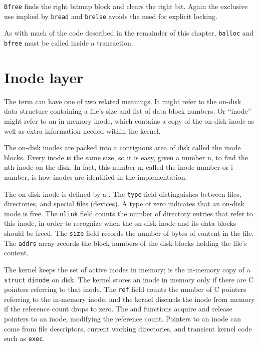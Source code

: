 \lstinline{Bfree}
finds the right bitmap block and clears the right bit.
Again the exclusive use implied by
\lstinline{bread}
and
\lstinline{brelse}
avoids the need for explicit locking.

As with much of the code described in the remainder of this chapter, 
\lstinline{balloc}
and
\lstinline{bfree}
must be called inside a transaction.
\section{Inode layer}

The term 
can have one of two related meanings.
It might refer to the on-disk data structure containing
a file's size and list of data block numbers.
Or ``inode'' might refer to an in-memory inode, which contains
a copy of the on-disk inode as well as extra information needed
within the kernel.

The on-disk inodes
are packed into a contiguous area
of disk called the inode blocks.
Every inode is the same size, so it is easy, given a
number n, to find the nth inode on the disk.
In fact, this number n, called the inode number or i-number,
is how inodes are identified in the implementation.

The on-disk inode is defined by a
.
The 
\lstinline{type}
field distinguishes between files, directories, and special
files (devices).
A type of zero indicates that an on-disk inode is free.
The
\lstinline{nlink}
field counts the number of directory entries that
refer to this inode, in order to recognize when the
on-disk inode and its data blocks should be freed.
The
\lstinline{size}
field records the number of bytes of content in the file.
The
\lstinline{addrs}
array records the block numbers of the disk blocks holding
the file's content.

The kernel keeps the set of active inodes in memory;
is the in-memory copy of a 
\lstinline{struct}
\lstinline{dinode}
on disk.
The kernel stores an inode in memory only if there are
C pointers referring to that inode. The
\lstinline{ref}
field counts the number of C pointers referring to the
in-memory inode, and the kernel discards the inode from
memory if the reference count drops to zero.
The
and
functions acquire and release pointers to an inode,
modifying the reference count.
Pointers to an inode can come from file descriptors,
current working directories, and transient kernel code
such as
\lstinline{exec}.

